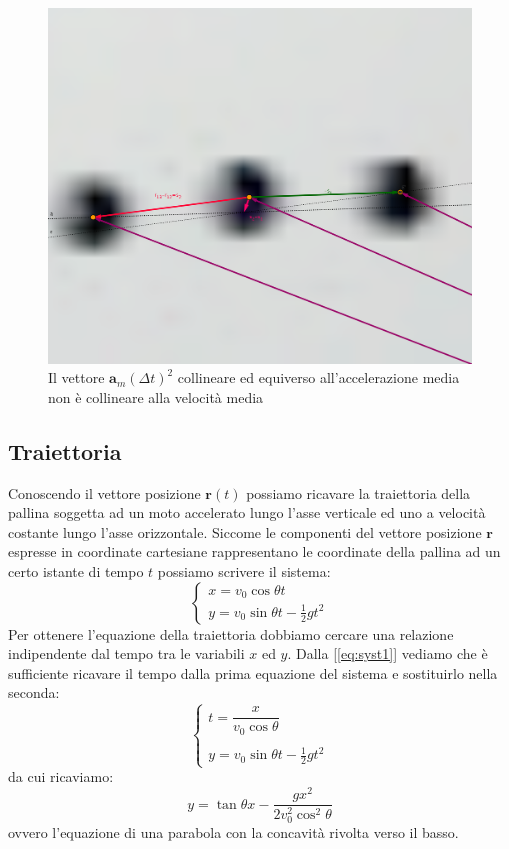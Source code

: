 \documentclass[a4paper,10pt,oneside]{article}
\begin{document}
\begin{figure}[H]
 \includegraphics[width=\textwidth]{./immagini/vettori_variazione_velocita.png}
\caption{Il vettore $\mathbf{a}_m(\Delta t)^2$ collineare ed equiverso all'accelerazione media non è collineare alla velocità media}\label{fig:a_media}
\end{figure}

\subsection*{Traiettoria}

Conoscendo il vettore posizione $\mathbf{r}(t)$ possiamo ricavare la traiettoria della pallina soggetta ad un moto accelerato lungo l'asse verticale ed uno a velocità costante lungo l'asse orizzontale. Siccome le componenti del vettore posizione $\mathbf{r}$ espresse in coordinate cartesiane rappresentano le coordinate della pallina ad un certo istante di tempo $t$ possiamo scrivere il sistema:
\begin{equation}\label{eq:syst1}
\begin{cases}
x=v_0\cos\theta t\\
y=v_0\sin\theta t-\frac{1}{2}gt^2
\end{cases}
\end{equation}
Per ottenere l'equazione della traiettoria dobbiamo cercare una relazione indipendente dal tempo tra le variabili $x$ ed $y$. Dalla [\ref{eq:syst1}] vediamo che è sufficiente ricavare il tempo dalla prima equazione del sistema e sostituirlo nella seconda:
\begin{equation}
\begin{cases}
t=\dfrac{x}{v_0\cos\theta}\\
\\
y=v_0\sin\theta t-\frac{1}{2}gt^2
\end{cases}
\end{equation}
da cui ricaviamo:
\begin{equation}
 y=\tan\theta x-\dfrac{gx^2}{2v_0^2\cos^2\theta}
\end{equation}
ovvero l'equazione di una parabola con la concavità rivolta verso il basso.
\end{document}
